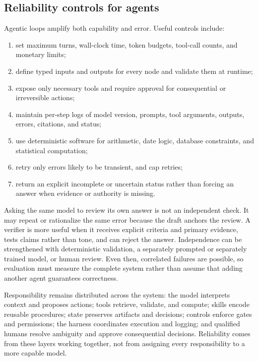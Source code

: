 \documentclass[12pt,oneside]{book}
\numberwithin{equation}{section}
\theoremstyle{definition}
\theoremstyle{plain}
\theoremstyle{remark}
\begin{document}
\subsection{Reliability controls for agents}

Agentic loops amplify both capability and error.  Useful controls include:
\begin{enumerate}
    \item set maximum turns, wall-clock time, token budgets, tool-call counts,
    and monetary limits;
    \item define typed inputs and outputs for every node and validate them at
    runtime;
    \item expose only necessary tools and require approval for consequential or
    irreversible actions;
    \item maintain per-step logs of model version, prompts, tool arguments,
    outputs, errors, citations, and status;
    \item use deterministic software for arithmetic, date logic, database
    constraints, and statistical computation;
    \item retry only errors likely to be transient, and cap retries;
    \item return an explicit incomplete or uncertain status rather than forcing
    an answer when evidence or authority is missing.
\end{enumerate}

Asking the same model to review its own answer is not an independent check.  It
may repeat or rationalize the same error because the draft anchors the review.
A verifier is more useful when it receives explicit criteria and primary
evidence, tests claims rather than tone, and can reject the answer.  Independence
can be strengthened with deterministic validation, a separately prompted or
separately trained model, or human review.  Even then, correlated failures are
possible, so evaluation must measure the complete system rather than assume
that adding another agent guarantees correctness.

Responsibility remains distributed across the system: the model interprets
context and proposes actions; tools retrieve, validate, and compute; skills
encode reusable procedures; state preserves artifacts and decisions; controls
enforce gates and permissions; the harness coordinates execution and logging;
and qualified humans resolve ambiguity and approve consequential decisions.
Reliability comes from these layers working together, not from assigning every
responsibility to a more capable model.
\end{document}

